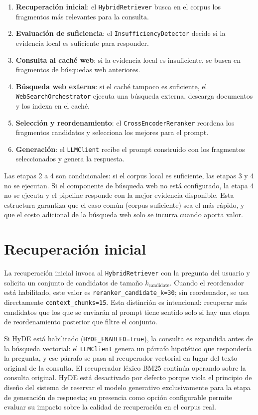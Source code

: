 \documentclass[11pt]{article}
\begin{document}
\begin{enumerate}
\item \textbf{Recuperación inicial}: el \texttt{HybridRetriever} busca en el corpus los
      fragmentos más relevantes para la consulta.
\item \textbf{Evaluación de suficiencia}: el \texttt{InsufficiencyDetector} decide si la
      evidencia local es suficiente para responder.
\item \textbf{Consulta al caché web}: si la evidencia local es insuficiente, se busca en
      fragmentos de búsquedas web anteriores.
\item \textbf{Búsqueda web externa}: si el caché tampoco es suficiente, el
      \texttt{WebSearchOrchestrator} ejecuta una búsqueda externa, descarga documentos y los
      indexa en el caché.
\item \textbf{Selección y reordenamiento}: el \texttt{CrossEncoderReranker} reordena los
      fragmentos candidatos y selecciona los mejores para el prompt.
\item \textbf{Generación}: el \texttt{LLMClient} recibe el prompt construido con los
      fragmentos seleccionados y genera la respuesta.
\end{enumerate}

Las etapas 2 a 4 son condicionales: si el corpus local es suficiente, las etapas 3 y 4 no se
ejecutan. Si el componente de búsqueda web no está configurado, la etapa 4 no se ejecuta y el
pipeline responde con la mejor evidencia disponible. Esta estructura garantiza que el caso
común (corpus suficiente) sea el más rápido, y que el costo adicional de la búsqueda web solo
se incurra cuando aporta valor.

\section{Recuperación inicial}

La recuperación inicial invoca al \texttt{HybridRetriever} con la pregunta del usuario y
solicita un conjunto de candidatos de tamaño $k_{\text{candidate}}$. Cuando el reordenador
está habilitado, este valor es \texttt{reranker\_candidate\_k=30}; sin reordenador, se usa
directamente \texttt{context\_chunks=15}. Esta distinción es intencional: recuperar más
candidatos que los que se enviarán al prompt tiene sentido solo si hay una etapa de
reordenamiento posterior que filtre el conjunto.

Si HyDE está habilitado (\texttt{HYDE\_ENABLED=true}), la consulta es expandida antes de la
búsqueda vectorial: el \texttt{LLMClient} genera un párrafo hipotético que respondería la
pregunta, y ese párrafo se pasa al recuperador vectorial en lugar del texto original de la
consulta. El recuperador léxico BM25 continúa operando sobre la consulta original. HyDE está
desactivado por defecto porque viola el principio de diseño del sistema de reservar el modelo
generativo exclusivamente para la etapa de generación de respuesta; su presencia como opción
configurable permite evaluar su impacto sobre la calidad de recuperación en el corpus real.
\end{document}
